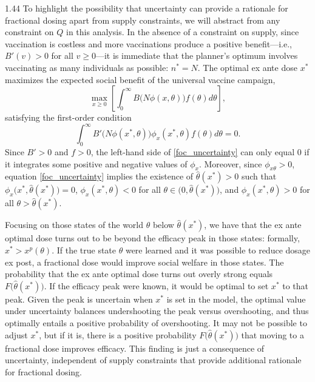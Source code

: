 \documentclass[12pt]{article}
\newcommand{\efficacy}{\phi}
\newcommand{\benefit}{B}
\newcommand{\xpeak}{x^{p}}
\begin{document}
\begin{spacing}{1.44}
To highlight the possibility that uncertainty can provide a rationale
for fractional dosing apart from supply constraints, we will abstract
from any constraint on $Q$ in this analysis. In the absence of a
constraint on supply, since vaccination is costless and more
vaccinations produce a positive benefit---i.e., $\benefit'(v) > 0$ for
all $v \geq 0$---it is immediate that the planner's optimum involves
vaccinating as many individuals as possible: $n^* = N$. The optimal ex
ante dose $x^*$ maximizes the expected social benefit of the universal
vaccine campaign,
\begin{equation}
\label{max_uncertainty}
\max_{x \geq 0} \left[ \int_0^\infty \benefit \! \bigl( N \efficacy(x,
  \theta) \bigr) f(\theta) d\theta \right],
\end{equation}
satisfying the first-order condition
\begin{equation}
\label{foc_uncertainty}
\int_0^\infty \benefit' \! \bigl( N \efficacy(x^*, \theta) \bigr)
\efficacy_x (x^*, \theta) f(\theta) d\theta = 0.
\end{equation}
Since $\benefit' > 0$ and $f > 0$, the left-hand side of
\eqref{foc_uncertainty} can only equal 0 if it integrates some
positive and negative values of $\efficacy_x$. Moreover, since
$\efficacy_{x\theta} > 0$, equation \eqref{foc_uncertainty} implies
the existence of $\hat{\theta}(x^*) > 0$ such that $\efficacy_x \bigl(
x^*, \hat{\theta}(x^*) \bigr) = 0$, $\efficacy_x (x^*, \theta) < 0$
for all $\theta \in \bigl( 0, \hat{\theta}(x^*) \bigr)$, and
$\efficacy_x (x^*, \theta) > 0$ for all $\theta > \hat{\theta}(x^*)$.

Focusing on those states of the world $\theta$ below
$\hat{\theta}(x^*)$, we have that the ex ante optimal dose turns out
to be beyond the efficacy peak in those states: formally, $x^* >
\xpeak(\theta)$. If the true state $\theta$ were learned and it was
possible to reduce dosage ex post, a fractional dose would improve
social welfare in those states. The probability that the ex ante
optimal dose turns out overly strong equals $F \bigl(
\hat{\theta}(x^*) \bigr)$. If the efficacy peak were known, it would
be optimal to set $x^*$ to that peak. Given the peak is uncertain when
$x^*$ is set in the model, the optimal value under uncertainty
balances undershooting the peak versus overshooting, and thus
optimally entails a positive probability of overshooting. It may not
be possible to adjust $x^*$, but if it is, there is a positive
probability $F \bigl( \hat{\theta}(x^*) \bigr)$ that moving to a
fractional dose improves efficacy. This finding is just a consequence
of uncertainty, independent of supply constraints that provide
additional rationale for fractional dosing.


\end{spacing}
\end{document}
